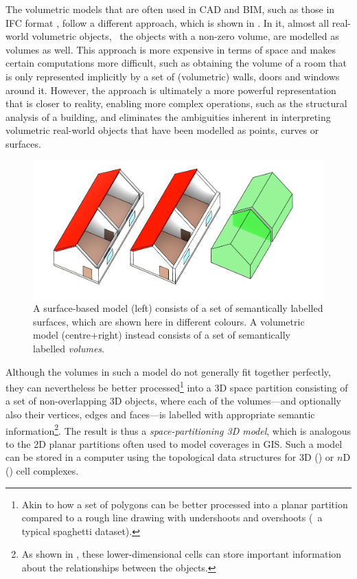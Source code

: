 The volumetric models that are often used in CAD and BIM, such as those in IFC format \citep{ISO16739:2013}, follow a different approach, which is shown in .
In it, almost all real-world volumetric objects, \ie\ the objects with a non-zero volume, are modelled as volumes as well.
This approach is more expensive in terms of space and makes certain computations more difficult, such as obtaining the volume of a room that is only represented implicitly by a set of (volumetric) walls, doors and windows around it.
However, the approach is ultimately a more powerful representation that is closer to reality, enabling more complex operations, such as the structural analysis of a building, and eliminates the ambiguities inherent in interpreting volumetric real-world objects that have been modelled as points, curves or surfaces.
\begin{figure}[tb]
  \centering
  \includegraphics[width=\linewidth]{figs/volumetric}
  \caption[Surface-based models vs.\ volumetric models]{A surface-based model (left) consists of a set of semantically labelled surfaces, which are shown here in different colours. A volumetric model (centre+right) instead consists of a set of semantically labelled \emph{volumes}.}
\label{fig:volumetric}
\end{figure}

Although the volumes in such a model do not generally fit together perfectly, they can nevertheless be better processed\footnote{Akin to how a set of polygons can be better processed into a planar partition compared to a rough line drawing with undershoots and overshoots (\ie\ a typical spaghetti dataset).} into a 3D space partition consisting of a set of non-overlapping 3D objects, where each of the volumes---and optionally also their vertices, edges and faces---is labelled with appropriate semantic information\footnote{As shown in , these lower-dimensional cells can store important information about the relationships between the objects.}.
The result is thus a \emph{space-partitioning 3D model}, which is analogous to the 2D planar partitions often used to model coverages in GIS.\@
Such a model can be stored in a computer using the topological data structures for 3D () or $n$D () cell complexes.

